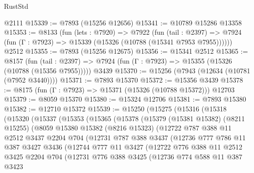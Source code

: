 \begin{lexlean}{RustStd}
\begin{coremodule}
{\begin{coremodule}
{{{{{{{{{{{{{{{{{{{{{{{{{{{{{{{{{{{{{{{{{{{{{{{{{{    @2111
@15339 := @7893 (@15256 @12656)
@15341 := @10789 @15286 @13358
@15353 := @8133
    (fun (lets : @7920) =>
    @7922
      (fun (tail : @2397) =>
      @7924 (fun (Γ : @7923) => @15339 (@15326 (@10788 (@15341 @7953 @7955))))))
    @2512
@15355 := @7893 (@15256 @12675)
@15356 := @15341 @2512
@15365 := @8157
    (fun (tail : @2397) => @7924 (fun (Γ : @7923) => @15355 (@15326 (@10788 (@15356 @7955)))))
    @3439
@15370 := @15256 (@7943 (@12634 (@10781 (@7952 @3440))))
@15371 := @7893 @15370
@15372 := @15356 @3439
@15378 := @8175 (fun (Γ : @7923) => @15371 (@15326 (@10788 @15372))) @12703
@15379 := @8059 @15370
@15380 := @15324 @12706
@15381 := @7893 @15380
@15382 := @12710 @15372
@15539 := @15250
    (@15275
      (@15316
        (@15318
          (@15320
            (@15337
              (@15353
                (@15365
                  (@15378
                    (@15379
                      (@15381 @15382)
                      (@8211 @15255)
                      (@8059
                        @15380
                        @15382
                        (@8216 @15323)
                        (@12722
                          @787
                          @388
                          @11
                          @2512
                          @3437
                          @2204
                          @704
                          (@12731
                            @787
                            @388
                            @3437
                            (@12736
                              @777
                              @786
                              @11
                              @387
                              @3427
                              @3436
                              (@12744
                                @777
                                @11
                                @3427
                                (@12722
                                  @776
                                  @388
                                  @11
                                  @2512
                                  @3425
                                  @2204
                                  @704
                                  (@12731
                                    @776
                                    @388
                                    @3425
                                    (@12736
                                      @774
                                      @588
                                      @11
                                      @387
                                      @3423
}}}}}}}}}}}}}}}}}}}}}}}}}}}}}}}}}}}}}}}}}}}}}}}}}}
\end{coremodule}}
\end{coremodule}
\end{lexlean}
